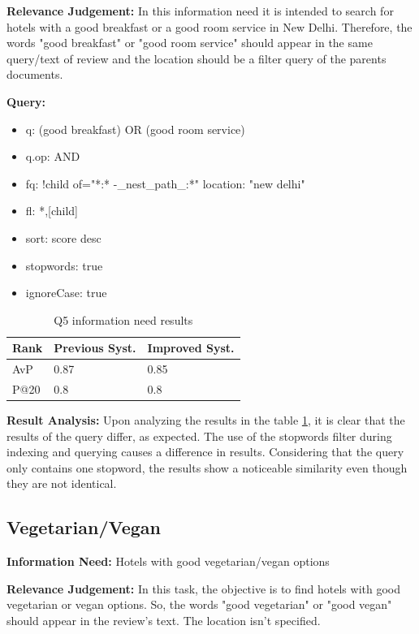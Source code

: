 \documentclass[sigconf]{acmart}
\begin{document}
\textbf{Relevance Judgement:} In this information need it is intended to search for hotels with a good breakfast or a good room service in New Delhi. Therefore, the words "good breakfast" or "good room service" should appear in the same query/text of review and the location should be a filter query of the parents documents.

\textbf{Query:}

\begin{itemize}
    \item q: (good breakfast) OR (good room service)
    \item q.op: AND
    \item fq: {!child of="*:* -\_nest\_path\_:*"} location: "new delhi"
    \item fl: *,[child]
    \item sort: score desc
    \item stopwords: true
    \item ignoreCase: true
\end{itemize}

\begin{table}[H]
\caption{Q5 information need results}
\label{tab:q5}
\begin{tabular}{lll}
\toprule
Rank & Previous Syst. & Improved Syst.\\
\midrule
AvP & 0.87 & 0.85  \\
P@20 & 0.8 & 0.8 \\
\bottomrule
\end{tabular}
\end{table}

\textbf{Result Analysis:} Upon analyzing the results in the table \ref{tab:q5}, it is clear that the results of the query differ, as expected. The use of the stopwords filter during indexing and querying causes a difference in results. Considering that the query only contains one stopword, the results show a noticeable similarity even though they are not identical.


\subsection{Vegetarian/Vegan}

\textbf{Information Need:} Hotels with good vegetarian/vegan options

\textbf{Relevance Judgement:} In this task, the objective is to find hotels with good vegetarian or vegan options. So, the words "good vegetarian" or "good vegan" should appear in the review's text. The location isn't specified.
\end{document}
